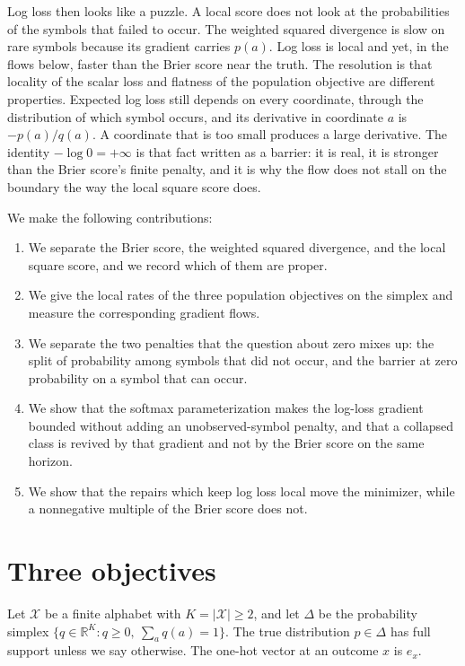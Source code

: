 \documentclass[10pt]{article}
\newcommand{\R}{\mathbb{R}}
\begin{document}
Log loss then looks like a puzzle.
A local score does not look at the probabilities of the symbols that failed to occur.
The weighted squared divergence is slow on rare symbols because its gradient carries $p(a)$.
Log loss is local and yet, in the flows below, faster than the Brier score near the truth.
The resolution is that locality of the scalar loss and flatness of the population objective are different properties.
Expected log loss still depends on every coordinate, through the distribution of which symbol occurs, and its derivative in coordinate $a$ is $-p(a)/q(a)$.
A coordinate that is too small produces a large derivative.
The identity $-\log 0 = +\infty$ is that fact written as a barrier: it is real, it is stronger than the Brier score's finite penalty, and it is why the flow does not stall on the boundary the way the local square score does.

We make the following contributions:
\begin{enumerate}
\item We separate the Brier score, the weighted squared divergence, and the local square score, and we record which of them are proper.
\item We give the local rates of the three population objectives on the simplex and measure the corresponding gradient flows.
\item We separate the two penalties that the question about zero mixes up: the split of probability among symbols that did not occur, and the barrier at zero probability on a symbol that can occur.
\item We show that the softmax parameterization makes the log-loss gradient bounded without adding an unobserved-symbol penalty, and that a collapsed class is revived by that gradient and not by the Brier score on the same horizon.
\item We show that the repairs which keep log loss local move the minimizer, while a nonnegative multiple of the Brier score does not.
\end{enumerate}

\section{Three objectives}
\label{sec:defs}

Let $\mathcal{X}$ be a finite alphabet with $K=|\mathcal{X}|\ge 2$, and let $\Delta$ be the probability simplex $\{q\in\R^K: q\ge 0,\ \sum_a q(a)=1\}$.
The true distribution $p\in\Delta$ has full support unless we say otherwise.
The one-hot vector at an outcome $x$ is $e_x$.
\end{document}
